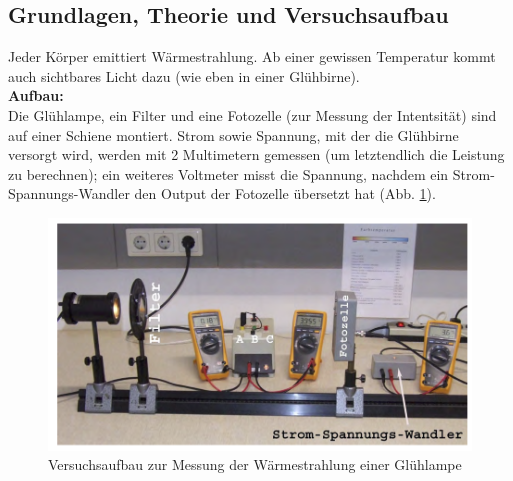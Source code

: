 \documentclass[12pt,a4paper]{article}
\begin{document}
\begin{multicols}{2}
\subsection{Grundlagen, Theorie und Versuchsaufbau}

Jeder Körper emittiert Wärmestrahlung. Ab einer gewissen Temperatur kommt auch sichtbares Licht dazu (wie eben in einer Glühbirne).\\

\textbf{Aufbau:}\\
Die Glühlampe, ein Filter und eine Fotozelle (zur Messung der Intentsität) sind auf einer Schiene montiert. Strom sowie Spannung, mit der die Glühbirne versorgt wird, werden mit 2 Multimetern gemessen (um letztendlich die Leistung zu berechnen); ein weiteres Voltmeter misst die Spannung, nachdem ein Strom-Spannungs-Wandler den Output der Fotozelle übersetzt hat (Abb. \ref{fig:waermestrahlung_aufbau}).




\end{multicols}
\begin{figure}[H]
	\centering
	\includegraphics[scale=0.9]{./data/waermestrahlung_aufbau.png}
	\caption{Versuchsaufbau zur Messung der Wärmestrahlung einer Glühlampe}
	\label{fig:waermestrahlung_aufbau}
\end{figure}
\end{document}
